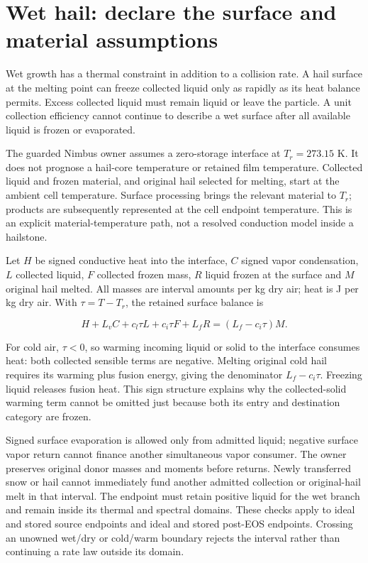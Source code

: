 \documentclass[
  11pt,
]{report}
\begin{document}
\section{Wet hail: declare the surface and material
assumptions}\label{wet-hail-declare-the-surface-and-material-assumptions}

Wet growth has a thermal constraint in addition to a collision rate. A
hail surface at the melting point can freeze collected liquid only as
rapidly as its heat balance permits. Excess collected liquid must remain
liquid or leave the particle. A unit collection efficiency cannot
continue to describe a wet surface after all available liquid is frozen
or evaporated.

The guarded Nimbus owner assumes a zero-storage interface at
\(T_r=273.15\) K. It does not prognose a hail-core temperature or
retained film temperature. Collected liquid and frozen material, and
original hail selected for melting, start at the ambient cell
temperature. Surface processing brings the relevant material to \(T_r\);
products are subsequently represented at the cell endpoint temperature.
This is an explicit material-temperature path, not a resolved conduction
model inside a hailstone.

Let \(H\) be signed conductive heat into the interface, \(C\) signed
vapor condensation, \(L\) collected liquid, \(F\) collected frozen mass,
\(R\) liquid frozen at the surface and \(M\) original hail melted. All
masses are interval amounts per kg dry air; heat is J per kg dry air.
With \(\tau=T-T_r\), the retained surface balance is

\[H+L_vC+c_l\tau L+c_i\tau F+L_fR
=\left(L_f-c_i\tau\right)M.\]

For cold air, \(\tau<0\), so warming incoming liquid or solid to the
interface consumes heat: both collected sensible terms are negative.
Melting original cold hail requires its warming plus fusion energy,
giving the denominator \(L_f-c_i\tau\). Freezing liquid releases fusion
heat. This sign structure explains why the collected-solid warming term
cannot be omitted just because both its entry and destination category
are frozen.

Signed surface evaporation is allowed only from admitted liquid;
negative surface vapor return cannot finance another simultaneous vapor
consumer. The owner preserves original donor masses and moments before
returns. Newly transferred snow or hail cannot immediately fund another
admitted collection or original-hail melt in that interval. The endpoint
must retain positive liquid for the wet branch and remain inside its
thermal and spectral domains. These checks apply to ideal and stored
source endpoints and ideal and stored post-EOS endpoints. Crossing an
unowned wet/dry or cold/warm boundary rejects the interval rather than
continuing a rate law outside its domain.
\end{document}
